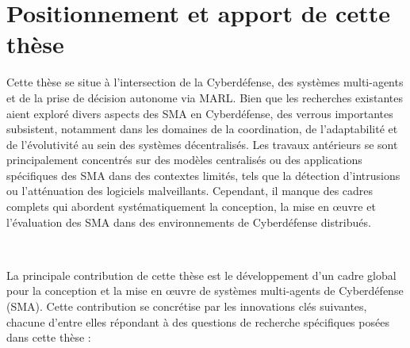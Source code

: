 \section{Positionnement et apport de cette thèse}

Cette thèse se situe à l'intersection de la Cyberdéfense, des systèmes multi-agents et de la prise de décision autonome via MARL. Bien que les recherches existantes aient exploré divers aspects des SMA en Cyberdéfense, des verrous importantes subsistent, notamment dans les domaines de la coordination, de l'adaptabilité et de l'évolutivité au sein des systèmes décentralisés. Les travaux antérieurs se sont principalement concentrés sur des modèles centralisés ou des applications spécifiques des SMA dans des contextes limités, tels que la détection d'intrusions ou l'atténuation des logiciels malveillants. Cependant, il manque des cadres complets qui abordent systématiquement la conception, la mise en œuvre et l'évaluation des SMA dans des environnements de Cyberdéfense distribués.

\

La principale contribution de cette thèse est le développement d'un cadre global pour la conception et la mise en œuvre de systèmes multi-agents de Cyberdéfense (SMA). Cette contribution se concrétise par les innovations clés suivantes, chacune d'entre elles répondant à des questions de recherche spécifiques posées dans cette thèse :

